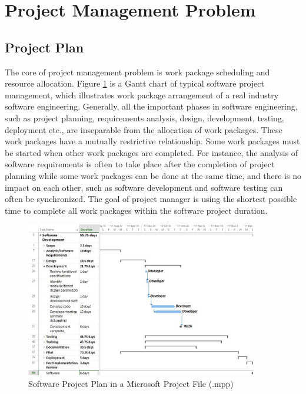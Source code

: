 
\section{Project Management Problem}
%

\subsection{Project Plan}
%

The core of project management problem is work package scheduling and resource
allocation.
Figure \ref{fig:sample} is a Gantt chart of typical software project management, which
illustrates work package arrangement of a real industry software engineering.
Generally, all the important phases in software engineering, such as project
planning, requirements analysis, design, development, testing, deployment etc., are inseparable from the allocation of work packages.  These work
packages have a mutually restrictive relationship. Some work packages must be
started when other work packages are completed. For instance, the analysis of
software requirements is often to take place after the completion of project planning
while some work packages can be done at the same time, and there is no
impact on each other, such as software development and software testing can
often be synchronized. The goal of project manager is using the shortest possible time
to complete all work packages within the software project duration.

\begin{figure}[!ht]
  \centering
  \includegraphics[width=0.9\textwidth]{figures/pm_sample.jpg}
  \vspace{-2mm}
  \caption{Software Project Plan in a Microsoft Project File (.mpp)}
  \label{fig:sample}
  \vspace{-2mm}
\end{figure}



